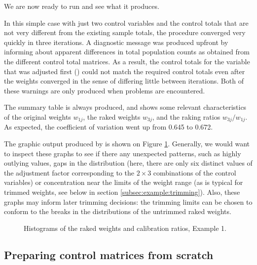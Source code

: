 \begin{stexample}[Example 1]
We are now ready to run  and see what it produces.

\begin{stlog}
\nullskip
\end{stlog}

In this simple case with just two control variables
and the control totals that are not very different from the
existing sample totals, the procedure converged very quickly
in three iterations. A diagnostic message was produced upfront
by  informing about apparent differences in
total population counts as obtained from the different
control total matrices. As a result, the control totals
for the variable that was adjusted first ()
could not match the required control totals even after the
weights converged in the sense of differing little between
iterations. Both of these warnings are only produced when
problems are encountered.

The summary table is always produced, and shows some relevant
characteristics of the original weights $w_{1j}$, the raked weights
$w_{3j}$, and the raking ratios $w_{3j}/w_{1j}$. As expected,
the coefficient of variation went up from 0.645 to 0.672.

The graphic output produced by  is shown on
Figure \ref{fig:example1}. Generally, we would want to inspect these
graphs to see if there any unexpected patterns, such as highly outlying values,
gaps in the distribution (here, there are only six distinct values of the 
adjustment factor corresponding to the $2\times3$ combinations of the control
variables) or concentration near the limits of the
weight range (as is typical for trimmed weights, see below in section
\ref{subsec:example:trimming}). Also, these graphs
may inform later trimming decisions: the trimming limits can be
chosen to conform to the breaks in the distributions of
the untrimmed raked weights.

\begin{figure}[h!]
\begin{center}
\end{center}
\caption{Histograms of the raked weights and calibration ratios, Example 1.}
\label{fig:example1}
\end{figure}

\end{stexample}

\subsection{Preparing control matrices from scratch}
\label{subsec:acs}

